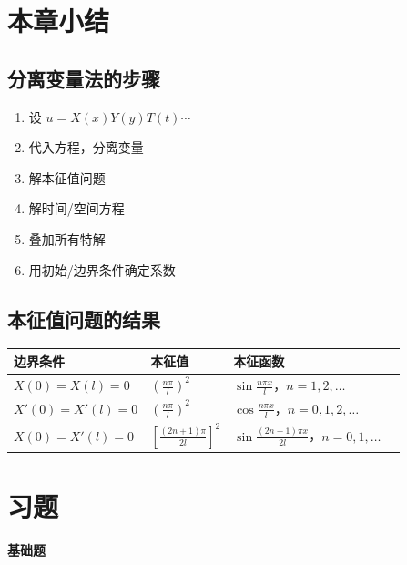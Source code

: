 \section{本章小结}

\subsection{分离变量法的步骤}

\begin{enumerate}
    \item 设 $u = X(x)Y(y)T(t)\cdots$
    \item 代入方程，分离变量
    \item 解本征值问题
    \item 解时间/空间方程
    \item 叠加所有特解
    \item 用初始/边界条件确定系数
\end{enumerate}

\subsection{本征值问题的结果}

\begin{table}[htbp]
\centering
\begin{tabular}{llll}
\toprule
\textbf{边界条件} & \textbf{本征值} & \textbf{本征函数} \\
\midrule
$X(0) = X(l) = 0$ & $\left(\frac{n\pi}{l}\right)^2$ & $\sin\frac{n\pi x}{l}$，$n = 1, 2, \ldots$ \\
$X'(0) = X'(l) = 0$ & $\left(\frac{n\pi}{l}\right)^2$ & $\cos\frac{n\pi x}{l}$，$n = 0, 1, 2, \ldots$ \\
$X(0) = X'(l) = 0$ & $\left[\frac{(2n+1)\pi}{2l}\right]^2$ & $\sin\frac{(2n+1)\pi x}{2l}$，$n = 0, 1, \ldots$ \\
\bottomrule
\end{tabular}
\end{table}

\section{习题}

\textbf{基础题}

